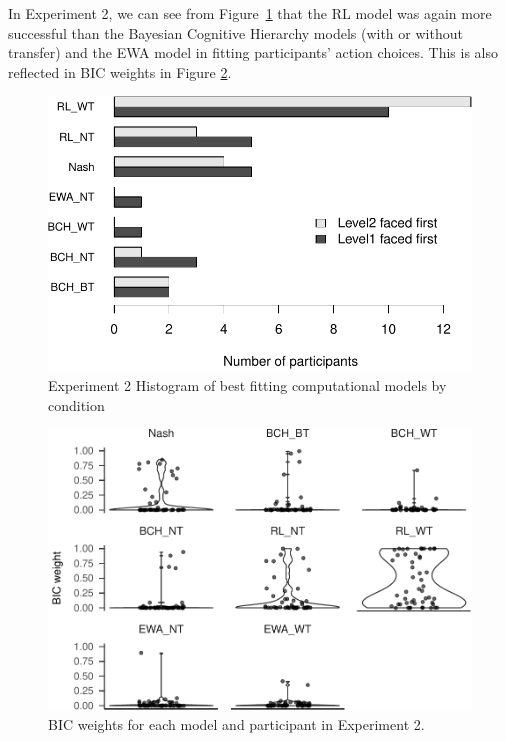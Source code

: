 \documentclass[
  english,
  man,floatsintext]{apa6}
\begin{document}
In Experiment 2, we can see from Figure~\ref{fig:exp2-comp-models} that the RL model was again more successful than the Bayesian Cognitive Hierarchy models (with or without transfer) and the EWA model in fitting participants' action choices. This is also reflected in BIC weights in Figure \ref{fig:xp2-BIC-weigths}.

\begin{figure}

{\centering \includegraphics[width=\textwidth]{paper_draft_2021_files/figure-latex/exp2-comp-models-1} 

}

\caption{Experiment 2 Histogram of best fitting computational models by condition}\label{fig:exp2-comp-models}
\end{figure}





\begin{figure}

{\centering \includegraphics[width=\textwidth]{paper_draft_2021_files/figure-latex/xp2-BIC-weigths-1} 

}

\caption{BIC weights for each model and participant in Experiment 2.}\label{fig:xp2-BIC-weigths}
\end{figure}
\end{document}
